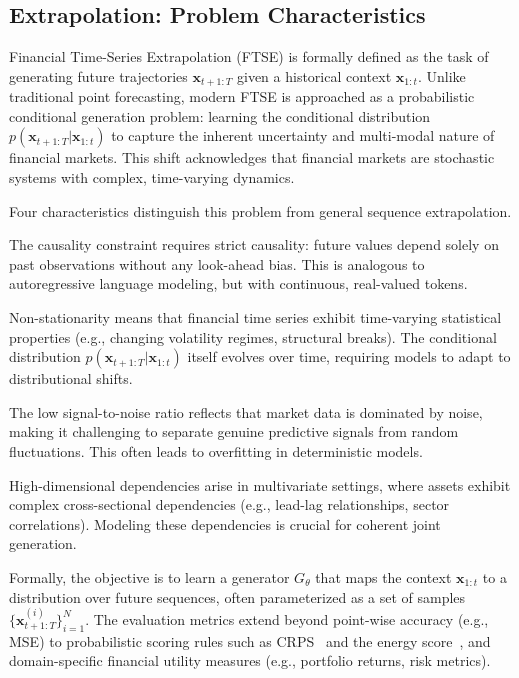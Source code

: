\subsection{Extrapolation: Problem Characteristics}
\label{sec:extrapolation}

Financial Time-Series Extrapolation (FTSE) is formally defined as the task of generating future trajectories $\mathbf{x}_{t+1:T}$ given a historical context $\mathbf{x}_{1:t}$. Unlike traditional point forecasting, modern FTSE is approached as a probabilistic conditional generation problem: learning the conditional distribution $p(\mathbf{x}_{t+1:T} | \mathbf{x}_{1:t})$ to capture the inherent uncertainty and multi-modal nature of financial markets. This shift acknowledges that financial markets are stochastic systems with complex, time-varying dynamics.

Four characteristics distinguish this problem from general sequence extrapolation.

The causality constraint requires strict causality: future values depend solely on past observations without any look-ahead bias. This is analogous to autoregressive language modeling, but with continuous, real-valued tokens.

Non-stationarity means that financial time series exhibit time-varying statistical properties (e.g., changing volatility regimes, structural breaks). The conditional distribution $p(\mathbf{x}_{t+1:T} | \mathbf{x}_{1:t})$ itself evolves over time, requiring models to adapt to distributional shifts.

The low signal-to-noise ratio reflects that market data is dominated by noise, making it challenging to separate genuine predictive signals from random fluctuations. This often leads to overfitting in deterministic models.

High-dimensional dependencies arise in multivariate settings, where assets exhibit complex cross-sectional dependencies (e.g., lead-lag relationships, sector correlations). Modeling these dependencies is crucial for coherent joint generation.

Formally, the objective is to learn a generator $G_\theta$ that maps the context $\mathbf{x}_{1:t}$ to a distribution over future sequences, often parameterized as a set of samples $\{\mathbf{x}_{t+1:T}^{(i)}\}_{i=1}^N$. The evaluation metrics extend beyond point-wise accuracy (e.g., MSE) to probabilistic scoring rules such as CRPS~\citep{gneiting2007strictly} and the energy score~\citep{gneiting2008assessing}, and domain-specific financial utility measures (e.g., portfolio returns, risk metrics).

